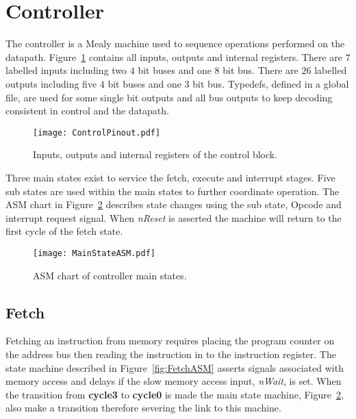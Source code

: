 \section{Controller}
\label{sec:controller}

The controller is a Mealy machine used to sequence operations performed on the datapath.
Figure~\ref{fig:ControlBlock} contains all inputs, outputs and internal registers.
There are $7$ labelled inputs including two $4$ bit buses and one $8$ bit bus.
There are $26$ labelled outputs including five $4$ bit buses and one $3$ bit bus.
Typedefs, defined in a global file, are used for some single bit outputs and all bus outputs to keep decoding consistent in control and the datapath. 


\begin{figure}[t]
   \centering
    \texttt{[image: ControlPinout.pdf]}
		\caption{Inputs, outputs and internal registers of the control block.}%
   \label{fig:ControlBlock}
\end{figure}

Three main states exist to service the fetch, execute and interrupt stages.
Five sub states are used within the main states to further coordinate operation.
The ASM chart in Figure~\ref{fig:MainStateASM} describes state changes using the sub state, Opcode and interrupt request signal.   
When \textit{nReset} is asserted the machine will return to the first cycle of the fetch state.



\begin{figure}[ht]
   \centering
    \texttt{[image: MainStateASM.pdf]}
		\caption{ASM chart of controller main states.}
		\label{fig:MainStateASM}
\end{figure}








\subsection{Fetch}

Fetching an instruction from memory requires placing the program counter on the address bus then reading the instruction in to the instruction register. 
The state machine described in Figure~\ref{fig:FetchASM} asserts signals associated with memory access and delays if the slow memory access input, \textit{nWait}, is set.
When the transition from \textbf{cycle3} to \textbf{cycle0} is made the main state machine, Figure~\ref{fig:MainStateASM}, also make a transition therefore severing the link to this machine. 

